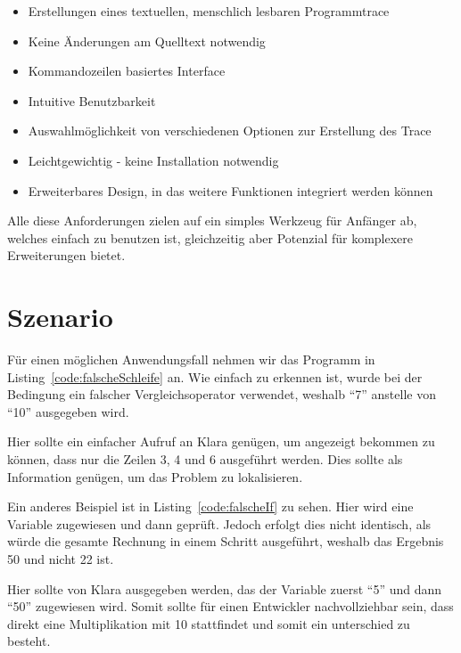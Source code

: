\begin{itemize}
	\item Erstellungen eines textuellen, menschlich lesbaren Programmtrace
	\item Keine Änderungen am Quelltext notwendig
	\item Kommandozeilen basiertes Interface
	\item Intuitive Benutzbarkeit
	\item Auswahlmöglichkeit von verschiedenen Optionen zur Erstellung des Trace
	\item Leichtgewichtig - keine Installation notwendig
	\item Erweiterbares Design, in das weitere Funktionen integriert werden können
\end{itemize}

Alle diese Anforderungen zielen auf ein simples Werkzeug für Anfänger ab, welches einfach zu benutzen ist, gleichzeitig aber Potenzial für komplexere Erweiterungen bietet.

\section{Szenario} 

Für einen möglichen Anwendungsfall nehmen wir das Programm in Listing~\ref{code:falscheSchleife} an. Wie einfach zu erkennen ist, wurde bei der Bedingung ein falscher Vergleichsoperator verwendet, weshalb "`7"' anstelle von "`10"' ausgegeben wird.



Hier sollte ein einfacher Aufruf an Klara genügen, um angezeigt bekommen zu können, dass nur die Zeilen 3, 4 und 6 ausgeführt werden. Dies sollte als Information genügen, um das Problem zu lokalisieren.

Ein anderes Beispiel ist in Listing~\ref{code:falscheIf} zu sehen. Hier wird eine Variable zugewiesen und dann geprüft. Jedoch erfolgt dies nicht identisch, als würde die gesamte Rechnung in einem Schritt ausgeführt, weshalb das Ergebnis 50 und nicht 22 ist.



Hier sollte von Klara ausgegeben werden, das der Variable  zuerst "`5"' und dann "`50"' zugewiesen wird. Somit sollte für einen Entwickler nachvollziehbar sein, dass direkt eine Multiplikation mit 10 stattfindet und somit ein unterschied zu  besteht.